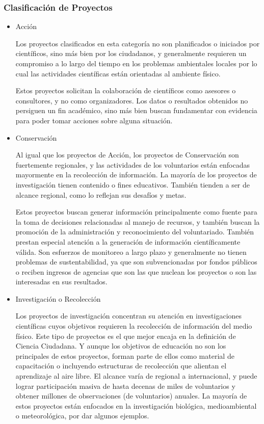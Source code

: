 \subsubsection{Clasificación de Proyectos}	

\begin{itemize}
	\item {Acción}
		
		Los proyectos clasificados en esta categoría no son planificados o iniciados por científicos, sino más bien por los ciudadanos, y generalmente requieren un compromiso a lo largo del tiempo en los problemas ambientales locales por lo cual las actividades científicas están orientadas al ambiente físico. 
		
		Estos proyectos solicitan la colaboración de científicos como asesores o consultores, y no como organizadores. Los datos o resultados obtenidos no persiguen un fin académico, sino más bien buscan fundamentar con evidencia para poder tomar acciones sobre alguna situación. 
	\item {Conservación} 
	
	Al igual que los proyectos de Acción, los proyectos de Conservación son fuertemente regionales, y las actividades de los voluntarios están enfocadas mayormente en la recolección de información. La mayoría de los proyectos de investigación tienen contenido o fines educativos. También tienden a ser de alcance regional, como lo reflejan sus desafíos y metas.
	
	Estos proyectos buscan generar información principalmente como fuente para la toma de decisiones relacionadas al manejo de recursos, y también buscan la promoción de la administración y reconocimiento del voluntariado. También prestan especial atención a la generación de información científicamente válida. Son esfuerzos de monitoreo a largo plazo y generalmente no tienen problemas de sustentabilidad, ya que son subvencionadas por fondos públicos o reciben ingresos de agencias que son las que nuclean los proyectos o son las interesadas en sus resultados.
	
	\item {Investigación o Recolección} 
	
	Los proyectos de investigación concentran su atención en investigaciones científicas cuyos objetivos requieren la recolección de información del medio físico. Este tipo de proyectos es el que mejor encaja en la definición de Ciencia Ciudadana. Y aunque los objetivos de educación no son los principales de estos proyectos, forman parte de ellos como material de capacitación o incluyendo estructuras de recolección que alientan el aprendizaje al aire libre. El alcance varía de regional a internacional, y puede lograr participación masiva de hasta decenas de miles de voluntarios y obtener millones de observaciones (de voluntarios) anuales. La mayoría de estos proyectos están enfocados en la investigación biológica, medioambiental o meteorológica, por dar algunos ejemplos. 
	

\end{itemize}
